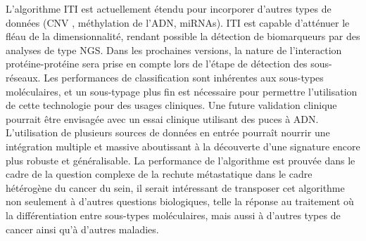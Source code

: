 		L'algorithme ITI est actuellement étendu pour incorporer d'autres types de données (\acs{CNV} \citep{Garcia2013}, méthylation de l'ADN, \acsp{miRNA}).
		ITI est capable d'atténuer le fléau de la dimensionnalité, rendant possible la détection de biomarqueurs par des analyses de type \acs{NGS}.
		Dans les prochaines versions, la nature de l'interaction protéine-protéine sera prise en compte lors de l'étape de détection des sous-réseaux.
		Les performances de classification sont inhérentes aux sous-types moléculaires, et un sous-typage plus fin est nécessaire pour permettre l'utilisation de cette technologie pour des usages cliniques.
		Une future validation clinique pourrait être envisagée avec un essai clinique utilisant des puces à ADN.
		L'utilisation de plusieurs sources de données en entrée pourraît nourrir une intégration multiple et massive aboutissant à la découverte d'une signature encore plus robuste et généralisable.
		La performance de l'algorithme est prouvée dans le cadre de la question complexe de la rechute métastatique dans le cadre hétérogène du cancer du sein, il serait intéressant de transposer cet algorithme non seulement à d'autres questions biologiques, telle la réponse au traitement où la différentiation entre sous-types moléculaires, mais aussi à d'autres types de cancer ainsi qu'à d'autres maladies.
